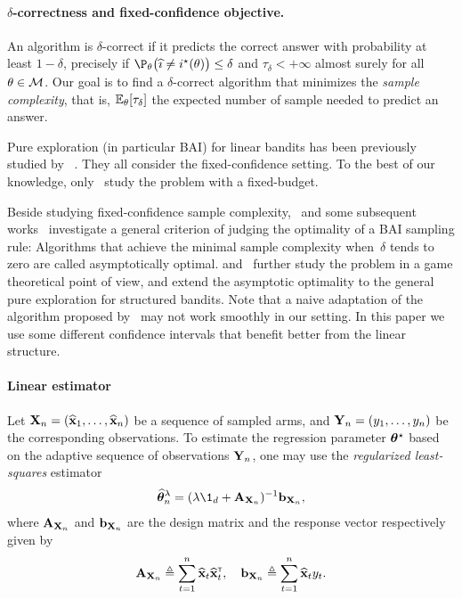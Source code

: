 \paragraph{$\delta$-correctness and fixed-confidence objective.}
An algorithm is $\delta$-correct if it predicts the correct answer with probability at least $1-\delta$, precisely if $\P_\theta \big(\hi \neq \istar(\theta)\big) \leq \delta$ and $\tau_\delta < +\infty$ almost surely for all $\theta \in\mathcal{M}$. Our goal is to find a $\delta$-correct algorithm that minimizes the \emph{sample complexity}, that is,  $\mathbb{E}_\theta[\tau_\delta]$ the expected number of sample needed to predict an answer.

Pure exploration (in particular BAI) for linear bandits has been previously studied by
~\citet{soare2014linear,tao2018alba,xu2018linear,zaki2019maxoverlap,fiez2019transductive,kazerouni2019glb}. They all consider the fixed-confidence setting. To the best of our knowledge, only~\citet{hoffman2014bayesgap} study the problem with a fixed-budget.

Beside studying fixed-confidence sample complexity,~\citet{garivier2016tracknstop} and some subsequent works~\citep{qin2017ttei,shang2020t3c} investigate a general criterion of judging the optimality of a BAI sampling rule: Algorithms that achieve the minimal sample complexity when~$\delta$ tends to zero are called asymptotically optimal. \citet{menard2019lma} and~\citet{degenne2019game} further study the problem in a game theoretical point of view, and extend the asymptotic optimality to the general pure exploration for structured bandits. Note that a naive adaptation of the algorithm proposed by~\citet{degenne2019game} may not work smoothly in our setting. In this paper we use some different confidence intervals that benefit better from the linear structure.

\paragraph{Linear estimator}
Let ${\bf X}_n=(\widehat{{\bf x}}_1,\ldots,\widehat{{\bf x}}_n)$ be a sequence of sampled arms, and ${\bf Y}_n=(y_1,\ldots,y_n)$ be the corresponding observations. To estimate the regression parameter ${\boldsymbol \theta}^\star$ based on the adaptive sequence of observations ${\bf Y}_n$, one may use the \emph{regularized least-squares} estimator
\begin{align}\label{eq:update_mean}
    \hat{\btheta}_n^{\lambda} = (\lambda \1_d + \bA_{\bX_n})^{-1}\bb_{\bX_n},
\end{align}
where ${\bf A}_{{\bf X}_n}$ and ${\bf b}_{{\bf X}_n}$ are the design matrix and the response vector respectively given by
\[
    {\bf A}_{{\bf X}_n} \triangleq \sum_{t=1}^n \widehat{{\bf x}}_t\widehat{{\bf x}}_t^\mathsf{\scriptscriptstyle T}, \quad {\bf b}_{{\bf X}_n} \triangleq \sum_{t=1}^n \widehat{{\bf x}}_t y_t.
\]

